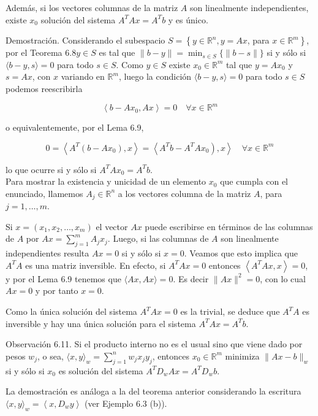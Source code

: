 \documentclass[10pt]{book}
\begin{document}
Además, si los vectores columnas de la matriz $A$ son linealmente independientes, existe $x_{0}$ solución del sistema $A^{T} A x=A^{T} b$ y es único.

Demostración. Considerando el subespacio $S=\left\{y \in \mathbb{R}^{n}, y=A x\right.$, para $\left.x \in \mathbb{R}^{m}\right\}$, por el Teorema $6.8 y \in S$ es tal que $\|b-y\|=\min _{s \in S}\{\|b-s\|\}$ si y sólo si $\langle b-y, s\rangle=0$ para todo $s \in S$. Como $y \in S$ existe $x_{0} \in \mathbb{R}^{m}$ tal que $y=A x_{0}$ y $s=A x$, con $x$ variando en $\mathbb{R}^{m}$, luego la condición $\langle b-y, s\rangle=0$ para todo $s \in S$ podemos reescribirla

$$
\left\langle b-A x_{0}, A x\right\rangle=0 \quad \forall x \in \mathbb{R}^{m}
$$

o equivalentemente, por el Lema 6.9,

$$
\left.0=\left\langle A^{T}\left(b-A x_{0}\right), x\right\rangle=\left\langle A^{T} b-A^{T} A x_{0}\right), x\right\rangle \quad \forall x \in \mathbb{R}^{m}
$$

lo que ocurre si y sólo si $A^{T} A x_{0}=A^{T} b$.\\
Para mostrar la existencia y unicidad de un elemento $x_{0}$ que cumpla con el enunciado, llamemos $A_{j} \in \mathbb{R}^{n}$ a los vectores columna de la matriz $A$, para $j=1, \ldots, m$.

Si $x=\left(x_{1}, x_{2}, \ldots, x_{m}\right)$ el vector $A x$ puede escribirse en términos de las columnas de $A$ por $A x=\sum_{j=1}^{m} A_{j} x_{j}$. Luego, si las columnas de $A$ son linealmente independientes resulta $A x=0$ si y sólo si $x=0$. Veamos que esto implica que $A^{T} A$ es una matriz inversible. En efecto, si $A^{T} A x=0$ entonces $\left\langle A^{T} A x, x\right\rangle=0$, y por el Lema 6.9 tenemos que $\langle A x, A x\rangle=0$. Es decir $\|A x\|^{2}=0$, con lo cual $A x=0$ y por tanto $x=0$.

Como la única solución del sistema $A^{T} A x=0$ es la trivial, se deduce que $A^{T} A$ es inversible y hay una única solución para el sistema $A^{T} A x=A^{T} b$.

Observación 6.11. Si el producto interno no es el usual sino que viene dado por pesos $w_{j}$, o sea, $\langle x, y\rangle_{w}=\sum_{j=1}^{n} w_{j} x_{j} y_{j}$, entonces $x_{0} \in \mathbb{R}^{m}$ minimiza $\|A x-b\|_{w}$ si y sólo si $x_{0}$ es solución del sistema $A^{T} D_{w} A x=A^{T} D_{w} b$.

La demostración es análoga a la del teorema anterior considerando la escritura $\langle x, y\rangle_{w}=\left\langle x, D_{w} y\right\rangle$ (ver Ejemplo 6.3 (b)).
\end{document}
